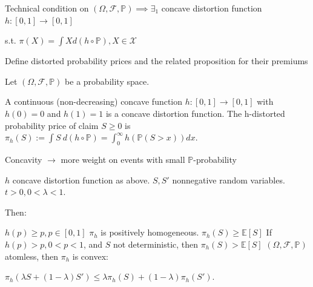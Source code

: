 \documentclass[11pt,a4paper,twoside]{article}
\begin{document}
Technical condition on \((\Omega, \mathcal{F}, \mathbb{P}) \implies \exists_1\) concave distortion function \(h: [0, 1] \rightarrow [0, 1]\)

s.t.
\(\pi(X) = \int X d(h \circ \mathbb{P}), X \in \mathcal{X}\)


Define distorted probability prices and the related proposition
for their premiums

Let \((\Omega, \mathcal{F}, \mathbb{P})\) be a probability space.

A continuous (non-decreasing) concave function \(h:[0,1]\rightarrow[0,1]\) with \(h(0)=0\) and
\(h(1)=1\) is a concave distortion function.
The h-distorted probability price of claim \(S\ge0\) is
\(\pi_{h}(S):=\int S~d(h\circ\mathbb{P})=\int_{0}^{\infty}h(\mathbb{P}(S>x))dx.\)

Concavity \(\rightarrow\) more weight on events with small \(\mathbb{P}\)-probability

\(h\) concave distortion function as above.
\(S, S'\) nonnegative random variables.
\(t > 0, 0 < \lambda < 1\).

Then:

\(h(p) \ge p, p \in [0, 1]\)
\(\pi_h\) is positively homogeneous.
\(\pi_h(S) \ge \mathbb{E}[S]\)
If \(h(p) > p, 0 < p < 1\), and \(S\) not deterministic, then \(\pi_h(S) > \mathbb{E}[S]\)
\((\Omega, \mathcal{F}, \mathbb{P})\) atomless, then \(\pi_h\) is convex:

\(\pi_h(\lambda S + (1 - \lambda)S') \le \lambda \pi_h(S) + (1 - \lambda)\pi_h(S').\)
\end{document}
